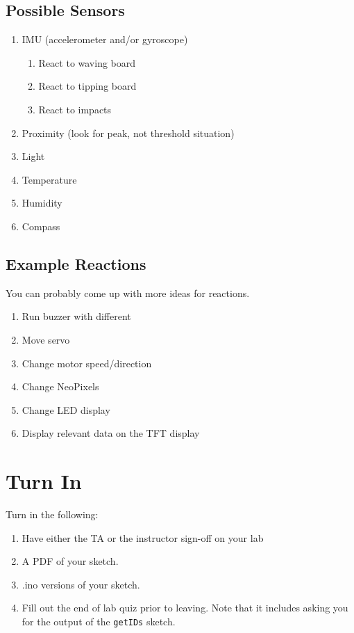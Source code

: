 \subsection{Possible Sensors}
\begin{enumerate}
    \item IMU (accelerometer and/or gyroscope)
    \begin{enumerate}
        \item React to waving board
        \item React to tipping board 
        \item React to impacts
    \end{enumerate}
    \item Proximity (look for peak, not threshold situation)
    \item Light
    \item Temperature
    \item Humidity
    \item Compass
\end{enumerate}

\subsection{Example Reactions}
You can probably come up with more ideas for reactions.
\begin{enumerate}
    \item Run buzzer with different \lstinline@tone@s 
    \item Move servo 
    \item Change motor speed/direction
    \item Change NeoPixels
    \item Change LED display
    \item Display relevant data on the TFT display
\end{enumerate}

\section{Turn In}
Turn in the following:
\begin{enumerate}
    \item Have either the TA or the instructor sign-off on your lab
    \item A PDF of your sketch.
    \item .ino versions of your sketch.
    \item Fill out the end of lab quiz prior to leaving. Note that it includes asking you 
            for the output of the \lstinline$getIDs$ sketch. 
\end{enumerate}

